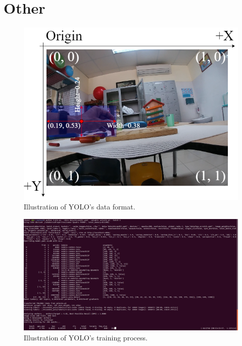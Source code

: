 \section{Other}
\begin{figure}
	\centerline{\includegraphics[width=0.5\linewidth]{Figs/yoloformat.png}}
	\caption{Illustration of YOLO’s data format.}
	\label{fig:yoloformat}
\end{figure}
\begin{figure}
	\centerline{\includegraphics[width=\textwidth]{Figs/yolov5/training_process_yolo.png}}
	\caption{Illustration of YOLO’s training process.}
	\label{fig:yoloformat}
\end{figure}

